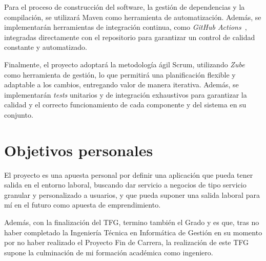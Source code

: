 Para el proceso de construcción del software, la gestión de dependencias y la compilación, se utilizará Maven como herramienta de automatización. Además, se implementarán herramientas de integración continua, como \textit{GitHub Actions}~\cite{github-actions}, integradas directamente con el repositorio para garantizar un control de calidad constante y automatizado.

Finalmente, el proyecto adoptará la metodología ágil Scrum, utilizando \textit{Zube}~\cite{zube} como herramienta de gestión, lo que permitirá una planificación flexible y adaptable a los cambios, entregando valor de manera iterativa. Además, se implementarán \emph{tests} unitarios y de integración exhaustivos para garantizar la calidad y el correcto funcionamiento de cada componente y del sistema en su conjunto.

\section{Objetivos personales}\label{objetivos-personales}
El proyecto es una apuesta personal por definir una aplicación que pueda tener salida en el entorno laboral, buscando dar servicio a negocios de tipo servicio granular y personalizado a usuarios, y que pueda suponer una salida laboral para mí en el futuro como apuesta de emprendimiento.

Además, con la finalización del TFG, termino también el Grado y es que, tras no haber completado la Ingeniería Técnica en Informática de Gestión en su momento por no haber realizado el Proyecto Fin de Carrera, la realización de este TFG supone la culminación de mi formación académica como ingeniero.
